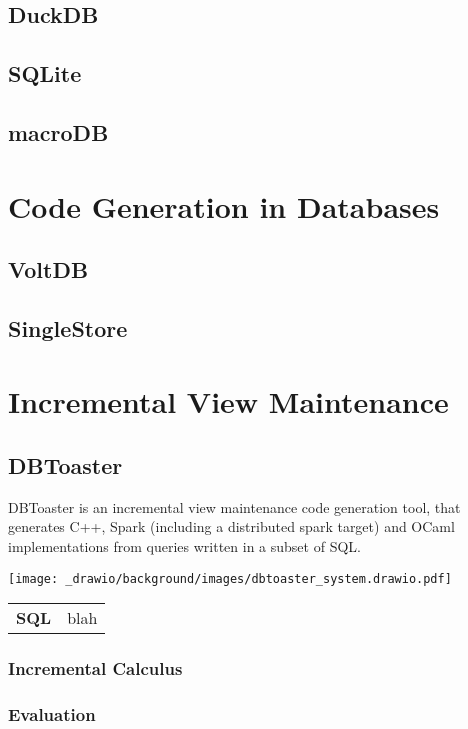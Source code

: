 \subsection{DuckDB}
\subsection{SQLite}
\subsection{macroDB}

\section{Code Generation in Databases}
\subsection{VoltDB}
\subsection{SingleStore}

\section{Incremental View Maintenance}

\subsection{DBToaster}
DBToaster is an incremental view maintenance code generation tool, that generates C++, Spark (including a distributed spark target) and OCaml implementations from queries written in a subset of SQL.
\begin{center}
    \texttt{[image: \_drawio/background/images/dbtoaster\_system.drawio.pdf]}
\end{center}

\begin{center}
    \begin{tabular}{l p{}}
        \textbf{SQL} & blah \\
    \end{tabular}
\end{center}
\subsubsection{Incremental Calculus}
\subsubsection{Evaluation}

